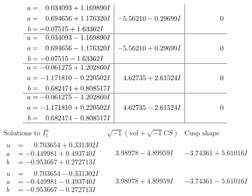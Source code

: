 \documentclass[1p]{elsarticle_modified}
\theoremstyle{definition}
\newcommand{\I}{\sqrt{-1}}
\begin{document}
$$\begin{array}{c|c|c}
\begin{aligned}
u &= \phantom{-}0.034093 + 1.169890 I \\
a &= \phantom{-}0.694656 + 1.176320 I \\
b &= -0.07515 + 1.63362 I\end{aligned}
 & -5.56210 - 0.29699 I & \phantom{-0.000000 } 0 \\ \hline\begin{aligned}
u &= \phantom{-}0.034093 - 1.169890 I \\
a &= \phantom{-}0.694656 - 1.176320 I \\
b &= -0.07515 - 1.63362 I\end{aligned}
 & -5.56210 + 0.29699 I & \phantom{-0.000000 } 0 \\ \hline\begin{aligned}
u &= -0.061275 + 1.202860 I \\
a &= -1.171810 - 0.220502 I \\
b &= \phantom{-}0.682474 + 0.808517 I\end{aligned}
 & \phantom{-}4.62735 + 2.61524 I & \phantom{-0.000000 } 0 \\ \hline\begin{aligned}
u &= -0.061275 - 1.202860 I \\
a &= -1.171810 + 0.220502 I \\
b &= \phantom{-}0.682474 - 0.808517 I\end{aligned}
 & \phantom{-}4.62735 - 2.61524 I & \phantom{-0.000000 } 0\\
 \hline 
 \end{array}$$\newpage$$\begin{array}{c|c|c}  
\text{Solutions to }I^u_{1}& \I (\text{vol} + \sqrt{-1}CS) & \text{Cusp shape}\\
 \hline 
\begin{aligned}
u &= \phantom{-}0.703654 + 0.331302 I \\
a &= -0.449981 + 0.493740 I \\
b &= -0.953667 + 0.272713 I\end{aligned}
 & \phantom{-}3.98978 - 4.89959 I & -3.74361 + 5.61016 I \\ \hline\begin{aligned}
u &= \phantom{-}0.703654 - 0.331302 I \\
a &= -0.449981 - 0.493740 I \\
b &= -0.953667 - 0.272713 I\end{aligned}
 & \phantom{-}3.98978 + 4.89959 I & -3.74361 - 5.61016 I \\ \hline\begin{aligned}

\end{aligned}
\end{array}$$
\end{document}
